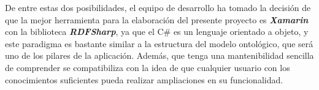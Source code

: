 De entre estas dos posibilidades, el equipo de desarrollo ha tomado la decisión de que la mejor herramienta 
para la elaboración del presente proyecto es \textit{\textbf{Xamarin}} con la biblioteca \textit{\textbf{RDFSharp}},
ya que el C\# es un lenguaje orientado a objeto, y este paradigma es bastante similar a la estructura del modelo 
ontológico, que será uno de los pilares de la aplicación. Además, que tenga una mantenibilidad sencilla de comprender 
se compatibiliza con la idea de que cualquier usuario con los conocimientos suficientes pueda realizar ampliaciones 
en su funcionalidad. 

